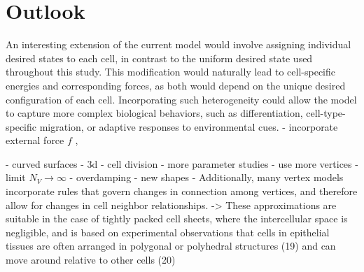 \section{Outlook}

An interesting extension of the current model would involve assigning individual desired states to each cell, in contrast to the uniform desired state used throughout this study. 
This modification would naturally lead to cell-specific energies and corresponding forces, as both would depend on the unique desired configuration of each cell. 
Incorporating such heterogeneity could allow the model to capture more complex biological behaviors, such as differentiation, cell-type-specific migration, or adaptive responses to environmental cues. 
- incorporate external force $f$ ,

- curved surfaces 
- 3d 
- cell division 
- more parameter studies 
- use more vertices  
- limit $N_V \rightarrow \infty$ 
- overdamping 
- new shapes  
-  Additionally, many vertex models incorporate rules that govern changes in connection among vertices, and therefore allow for changes in cell neighbor relationships.
->  These approximations are suitable in the case of tightly packed cell sheets, where the intercellular space is negligible, and is based on experimental observations that cells in epithelial tissues are often arranged in polygonal or polyhedral structures (19) and can move around relative to other cells (20)